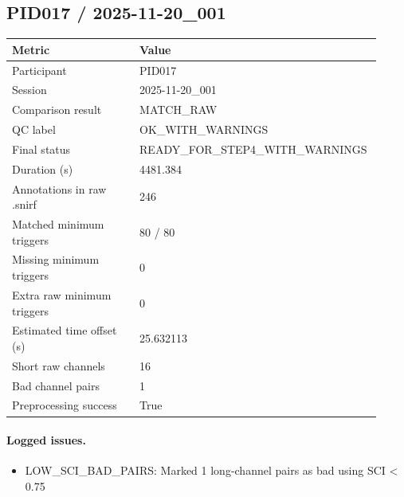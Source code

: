 \subsection*{PID017 / 2025-11-20\_001}
\begin{tabular}{p{0.34\linewidth}p{0.58\linewidth}}
\toprule
Metric & Value\\
\midrule
Participant & PID017\\
Session & 2025-11-20\_001\\
Comparison result & MATCH\_RAW\\
QC label & OK\_WITH\_WARNINGS\\
Final status & READY\_FOR\_STEP4\_WITH\_WARNINGS\\
Duration (s) & 4481.384\\
Annotations in raw .snirf & 246\\
Matched minimum triggers & 80 / 80\\
Missing minimum triggers & 0\\
Extra raw minimum triggers & 0\\
Estimated time offset (s) & 25.632113\\
Short raw channels & 16\\
Bad channel pairs & 1\\
Preprocessing success & True\\
\bottomrule
\end{tabular}
\paragraph{Logged issues.}
\begin{itemize}
\item [WARNING] LOW\_SCI\_BAD\_PAIRS: Marked 1 long-channel pairs as bad using SCI < 0.75
\end{itemize}
